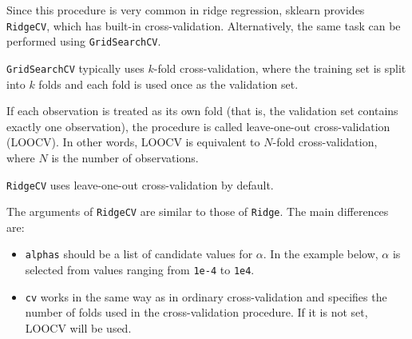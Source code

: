\documentclass[
  letterpaper,
  DIV=11,
  numbers=noendperiod]{scrreprt}
\providecommand{\tightlist}{%
  \setlength{\itemsep}{0pt}\setlength{\parskip}{0pt}}
\theoremstyle{definition}
\theoremstyle{definition}
\theoremstyle{plain}
\theoremstyle{plain}
\theoremstyle{remark}
\begin{document}
Since this procedure is very common in ridge regression, sklearn
provides \texttt{RidgeCV}, which has built-in cross-validation.
Alternatively, the same task can be performed using
\texttt{GridSearchCV}.

\begin{tcolorbox}[enhanced jigsaw, arc=.35mm, bottomrule=.15mm, bottomtitle=1mm, breakable, colback=white, colbacktitle=quarto-callout-note-color!10!white, colframe=quarto-callout-note-color-frame, coltitle=black, left=2mm, leftrule=.75mm, opacityback=0, opacitybacktitle=0.6, rightrule=.15mm, title=\textcolor{quarto-callout-note-color}{\faInfo}\hspace{0.5em}{Leave-one-out cross-validation}, titlerule=0mm, toprule=.15mm, toptitle=1mm]

\texttt{GridSearchCV} typically uses \(k\)-fold cross-validation, where
the training set is split into \(k\) folds and each fold is used once as
the validation set.

If each observation is treated as its own fold (that is, the validation
set contains exactly one observation), the procedure is called
leave-one-out cross-validation (LOOCV). In other words, LOOCV is
equivalent to \(N\)-fold cross-validation, where \(N\) is the number of
observations.

\texttt{RidgeCV} uses leave-one-out cross-validation by default.

\end{tcolorbox}

The arguments of \texttt{RidgeCV} are similar to those of
\texttt{Ridge}. The main differences are:

\begin{itemize}
\tightlist
\item
  \texttt{alphas} should be a list of candidate values for \(\alpha\).
  In the example below, \(\alpha\) is selected from values ranging from
  \texttt{1e-4} to \texttt{1e4}.
\item
  \texttt{cv} works in the same way as in ordinary cross-validation and
  specifies the number of folds used in the cross-validation procedure.
  If it is not set, LOOCV will be used.
\end{itemize}
\end{document}
